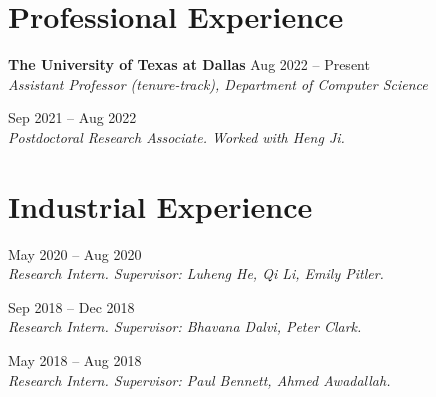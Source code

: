 
\vspace{-1mm}
\section{Professional Experience}

\noindent \textbf{The University of Texas at Dallas} \hfill Aug 2022 -- Present \\
\indent \textit{Assistant Professor (tenure-track), Department of Computer Science}

 \hfill Sep 2021 -- Aug 2022 \\
\indent \textit{Postdoctoral Research Associate. Worked with Heng Ji.} \\


\vspace{-1mm}
\section{Industrial Experience}

 \hfill May 2020 -- Aug 2020 \\
\indent \textit{Research Intern. Supervisor: Luheng He, Qi Li, Emily Pitler.}

 \hfill Sep 2018 -- Dec 2018 \\
\indent \textit{Research Intern. Supervisor: Bhavana Dalvi, Peter Clark.}

 \hfill May 2018 -- Aug 2018 \\
\indent \textit{Research Intern. Supervisor: Paul Bennett, Ahmed Awadallah.} \\
